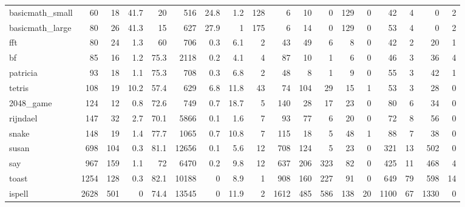 \begin{tabular}{lrrrrrrrrrrrrrrrrr}
 basicmath\_small &       60 &   18 &   41.7 &     20   &     516 &   24.8 &      1.2 &   128 &       6 &   10 &     0 &   129 &     0 &    42 &      4 &         0 &       2 \\
 basicmath\_large &       80 &   26 &   41.3 &     15   &     627 &   27.9 &      1   &   175 &       6 &   14 &     0 &   129 &     0 &    53 &      4 &         0 &       2 \\
 fft             &       80 &   24 &    1.3 &     60   &     706 &    0.3 &      6.1 &     2 &      43 &   49 &     6 &     8 &     0 &    42 &      2 &        20 &       1 \\
 bf              &       85 &   16 &    1.2 &     75.3 &    2118 &    0.2 &      4.1 &     4 &      87 &   10 &     1 &     6 &     0 &    46 &      3 &        36 &       4 \\
 patricia        &       93 &   18 &    1.1 &     75.3 &     708 &    0.3 &      6.8 &     2 &      48 &    8 &     1 &     9 &     0 &    55 &      3 &        42 &       1 \\
 tetris          &      108 &   19 &   10.2 &     57.4 &     629 &    6.8 &     11.8 &    43 &      74 &  104 &    29 &    15 &     1 &    53 &      3 &        28 &       0 \\
 2048\_game       &      124 &   12 &    0.8 &     72.6 &     749 &    0.7 &     18.7 &     5 &     140 &   28 &    17 &    23 &     0 &    80 &      6 &        34 &       0 \\
 rijndael        &      147 &   32 &    2.7 &     70.1 &    5866 &    0.1 &      1.6 &     7 &      93 &   77 &     6 &    20 &     0 &    72 &      8 &        56 &       0 \\
 snake           &      148 &   19 &    1.4 &     77.7 &    1065 &    0.7 &     10.8 &     7 &     115 &   18 &     5 &    48 &     1 &    88 &      7 &        38 &       0 \\
 susan           &      698 &  104 &    0.3 &     81.1 &   12656 &    0.1 &      5.6 &    12 &     708 &  124 &     5 &    23 &     0 &   321 &     13 &       502 &       0 \\
 say             &      967 &  159 &    1.1 &     72   &    6470 &    0.2 &      9.8 &    12 &     637 &  206 &   323 &    82 &     0 &   425 &     11 &       468 &       4 \\
 toast           &     1254 &  128 &    0.3 &     82.1 &   10188 &    0   &      8.9 &     1 &     908 &  160 &   227 &    91 &     0 &   649 &     79 &       598 &      14 \\
 ispell          &     2628 &  501 &    0   &     74.4 &   13545 &    0   &     11.9 &     2 &    1612 &  485 &   586 &   138 &    20 &  1100 &     67 &      1330 &       0 \\

\end{tabular}
